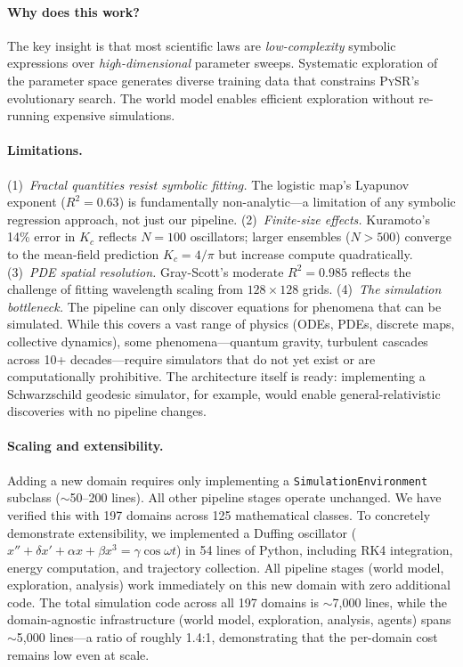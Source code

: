 \documentclass{article}
\newcommand{\pysr}{\textsc{PySR}}
\begin{document}
\paragraph{Why does this work?}
The key insight is that most scientific laws are \emph{low-complexity}
symbolic expressions over \emph{high-dimensional} parameter sweeps.
Systematic exploration of the parameter space generates diverse training
data that constrains \pysr{}'s evolutionary search. The world model
enables efficient exploration without re-running expensive simulations.

\paragraph{Limitations.}
(1)~\emph{Fractal quantities resist symbolic fitting.}
The logistic map's Lyapunov exponent ($R^2 = 0.63$) is fundamentally
non-analytic---a limitation of any symbolic regression approach, not
just our pipeline.
(2)~\emph{Finite-size effects.}
Kuramoto's 14\% error in $K_c$ reflects $N=100$ oscillators;
larger ensembles ($N > 500$) converge to the mean-field prediction
$K_c = 4/\pi$ but increase compute quadratically.
(3)~\emph{PDE spatial resolution.}
Gray-Scott's moderate $R^2 = 0.985$ reflects the challenge of
fitting wavelength scaling from $128 \times 128$ grids.
(4)~\emph{The simulation bottleneck.}
The pipeline can only discover equations for phenomena that can be
simulated. While this covers a vast range of physics (ODEs, PDEs,
discrete maps, collective dynamics), some phenomena---quantum gravity,
turbulent cascades across 10+ decades---require simulators that do not
yet exist or are computationally prohibitive. The architecture itself
is ready: implementing a Schwarzschild geodesic simulator, for example,
would enable general-relativistic discoveries with no pipeline changes.

\paragraph{Scaling and extensibility.}
Adding a new domain requires only implementing a \texttt{SimulationEnvironment}
subclass ($\sim$50--200 lines). All other pipeline stages operate unchanged.
We have verified this with 197 domains across 125 mathematical classes.
To concretely demonstrate extensibility, we implemented a Duffing
oscillator ($x'' + \delta x' + \alpha x + \beta x^3 = \gamma\cos\omega t$)
in 54 lines of Python, including RK4 integration, energy computation, and
trajectory collection. All pipeline stages (world model, exploration,
analysis) work immediately on this new domain with zero additional code.
The total simulation code across all 197 domains is $\sim$7,000 lines,
while the domain-agnostic infrastructure (world model, exploration,
analysis, agents) spans $\sim$5,000 lines---a ratio of roughly 1.4:1,
demonstrating that the per-domain cost remains low even at scale.
\end{document}
